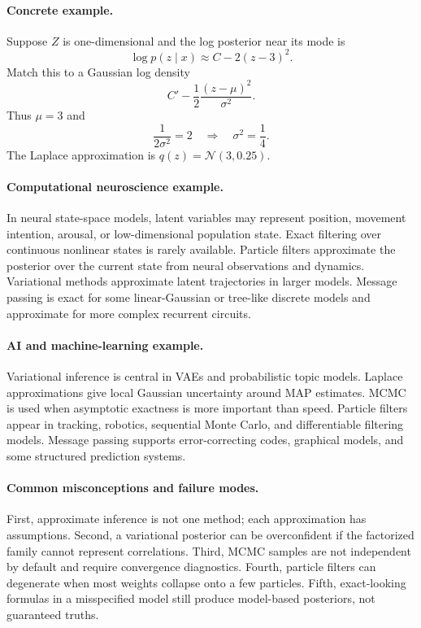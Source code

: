 \paragraph{Concrete example.}
Suppose \(Z\) is one-dimensional and the log posterior near its mode is
\[
\log p(z\mid x)\approx C-2(z-3)^2.
\]
Match this to a Gaussian log density
\[
C'-\frac12\frac{(z-\mu)^2}{\sigma^2}.
\]
Thus \(\mu=3\) and
\[
\frac{1}{2\sigma^2}=2
\quad\Longrightarrow\quad
\sigma^2=\frac14.
\]
The Laplace approximation is \(q(z)=\mathcal N(3,0.25)\).

\paragraph{Computational neuroscience example.}
In neural state-space models, latent variables may represent position, movement intention, arousal, or low-dimensional population state. Exact filtering over continuous nonlinear states is rarely available. Particle filters approximate the posterior over the current state from neural observations and dynamics. Variational methods approximate latent trajectories in larger models. Message passing is exact for some linear-Gaussian or tree-like discrete models and approximate for more complex recurrent circuits.

\paragraph{AI and machine-learning example.}
Variational inference is central in VAEs and probabilistic topic models. Laplace approximations give local Gaussian uncertainty around MAP estimates. MCMC is used when asymptotic exactness is more important than speed. Particle filters appear in tracking, robotics, sequential Monte Carlo, and differentiable filtering models. Message passing supports error-correcting codes, graphical models, and some structured prediction systems.

\paragraph{Common misconceptions and failure modes.}
First, approximate inference is not one method; each approximation has assumptions. Second, a variational posterior can be overconfident if the factorized family cannot represent correlations. Third, MCMC samples are not independent by default and require convergence diagnostics. Fourth, particle filters can degenerate when most weights collapse onto a few particles. Fifth, exact-looking formulas in a misspecified model still produce model-based posteriors, not guaranteed truths.

